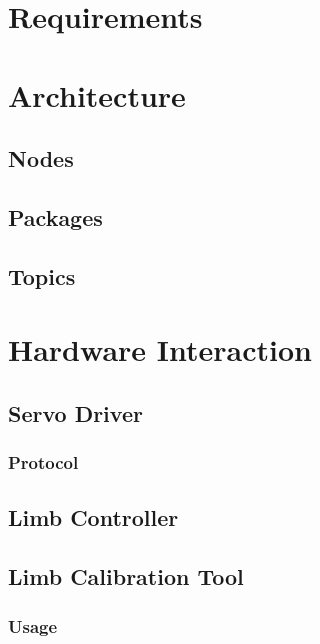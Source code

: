\documentclass{l4proj}
\begin{document}

\chapter{Requirements}


\chapter{Architecture}
\section{Nodes}
\section{Packages}
\section{Topics}


\chapter{Hardware Interaction}

\section{Servo Driver}
\subsection{Protocol}

\section{Limb Controller}

\section{Limb Calibration Tool}
\subsection{Usage}
\end{document}
